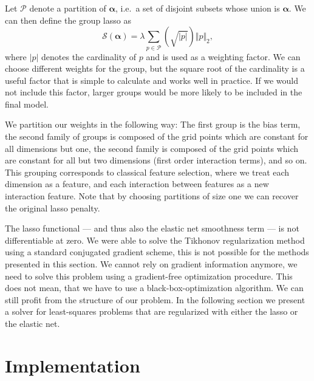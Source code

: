 Let \(\mathcal{P}\) denote a partition of \(\bm{\alpha}\), i.e.~a set of disjoint subsets whose union is \(\bm{\alpha}\).
We can then define the group lasso as
\begin{equation*}
  \mathcal{S}({\bm{\alpha}}) = \lambda \sum_{p \in \mathcal{P}} \left(\sqrt{\vert p \vert}\right) \Vert  p \Vert_2,
\end{equation*}
where \(\vert p \vert\) denotes the cardinality of \(p\) and is used as a weighting factor.
We can choose different weights for the group, but the square root of the cardinality is a useful factor that is simple to calculate and works well in practice.
If we would not include this factor, larger groups would be more likely to be included in the final model.

We partition our weights in the following way:
The first group is the bias term, the second family of groups is composed of the grid points which are constant for all dimensions but one, the second family is composed of the grid points which are constant for all but two dimensions (first order interaction terms), and so on.
This grouping corresponds to classical feature selection, where we treat each dimension as a feature, and each interaction between features as a new interaction feature.
Note that by choosing partitions of size one we can recover the original lasso penalty.

The lasso functional --- and thus also the elastic net smoothness term --- is not differentiable at zero.
We were able to solve the Tikhonov regularization method using a standard conjugated gradient scheme, this is not possible for the methods presented in this section.
We cannot rely on gradient information anymore, we need to solve this problem using a gradient-free optimization procedure.
This does not mean, that we have to use a black-box-optimization algorithm.
We can still profit from the structure of our problem.
In the following section we present a solver for least-squares problems that are regularized with either the lasso or the elastic net. 


\section{Implementation}


